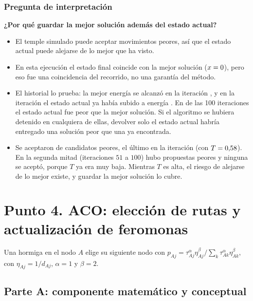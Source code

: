 \documentclass[12pt,a4paper]{article}
\begin{document}
\subsubsection{Pregunta de interpretación}

\textbf{¿Por qué guardar la mejor solución además del estado actual?}
\begin{itemize}
  \item El temple simulado puede aceptar movimientos peores, así que el
  estado actual puede alejarse de lo mejor que ha visto.
  \item En esta ejecución el estado final coincide con la mejor solución
  ($x=0$), pero eso fue una coincidencia del recorrido, no una
  garantía del método.
  \item El historial lo prueba: la mejor energía \PtresEnergia{} se alcanzó
  en la iteración \PtresIterMejor{}, y en la iteración \PtresIterSalida{} el
  estado actual ya había subido a energía \PtresEnergiaSalida{}. En
  \PtresPeorQueMejor{} de las 100 iteraciones el estado actual fue peor que
  la mejor solución. Si el algoritmo se hubiera detenido en cualquiera de
  ellas, devolver solo el estado actual habría entregado una solución peor
  que una ya encontrada.
  \item Se aceptaron \PtresPeores{} de \PtresPropuestasPeores{} candidatos
  peores, el último en la iteración \PtresUltimoPeor{} (con
  $T=0{,}58$). En la segunda mitad (iteraciones $51$ a $100$)
  hubo \PtresPropuestasSegunda{} propuestas peores y ninguna se aceptó,
  porque $T$ ya era muy baja. Mientras $T$ es alta, el riesgo de alejarse de lo mejor
  existe, y guardar la mejor solución lo cubre.
\end{itemize}

\section{Punto 4. ACO: elección de rutas y actualización de feromonas}

Una hormiga en el nodo $A$ elige su siguiente nodo con
$p_{Aj}=\tau_{Aj}^{\alpha}\eta_{Aj}^{\beta}/\sum_k\tau_{Ak}^{\alpha}
\eta_{Ak}^{\beta}$, con $\eta_{Aj}=1/d_{Aj}$, $\alpha=1$ y $\beta=2$.

\subsection{Parte A: componente matemático y conceptual}
\end{document}

